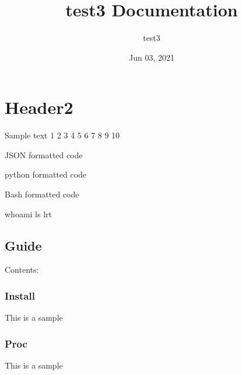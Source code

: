 \documentclass[letterpaper,10pt,english]{sphinxmanual}
\title{test3 Documentation}
\date{Jun 03, 2021}
\author{test3}
\begin{document}
\pagestyle{empty}
\sphinxmaketitle
\pagestyle{plain}
\sphinxtableofcontents
\pagestyle{normal}
\label{\detokenize{index::doc}}



\chapter{Header2}
\label{\detokenize{index:header2}}
\sphinxAtStartPar
Sample text 1 2 3 4 5 6 7 8 9 10

\sphinxAtStartPar
JSON formatted code

\begin{sphinxVerbatim}[commandchars=\\\{\}]
   
\end{sphinxVerbatim}

\sphinxAtStartPar
python formatted code

\begin{sphinxVerbatim}[commandchars=\\\{\}]
  
\end{sphinxVerbatim}

\sphinxAtStartPar
Bash formatted code

\begin{sphinxVerbatim}[commandchars=\\\{\}]
whoami
ls \PYGZhy{}lrt
\end{sphinxVerbatim}


\section{Guide}
\label{\detokenize{index:guide}}
\sphinxAtStartPar
Contents:


\subsection{Install}
\label{\detokenize{install:install}}\label{\detokenize{install::doc}}
\sphinxAtStartPar
This is a sample


\subsection{Proc}
\label{\detokenize{procedures:proc}}\label{\detokenize{procedures::doc}}
\sphinxAtStartPar
This is a sample
\end{document}
